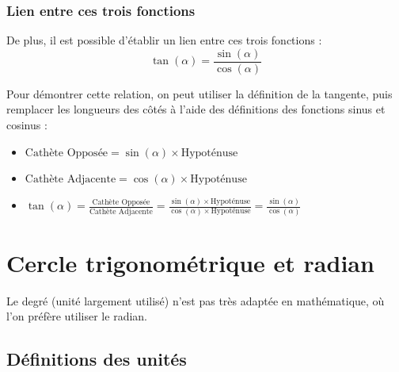 \documentclass[a4paper]{article}
\begin{document}
			\bigbreak
			\bigbreak
			\bigbreak
			\bigbreak
			\bigbreak
			\bigbreak



		\subsubsection{Lien entre ces trois fonctions}

			De plus,
			il est possible d'établir un lien entre ces trois fonctions :
			{ \LARGE $$ \tan(\alpha) = \frac{\sin(\alpha)}{\cos(\alpha)} $$}

			\medbreak
			\medbreak

			Pour démontrer cette relation, 
			on peut utiliser la définition de la tangente, 
			puis remplacer les longueurs des côtés à l'aide 
			des définitions des fonctions sinus et cosinus :

			\medbreak

			\begin{itemize}
				\item [ ] $\text{Cathète Opposée}   = \sin(\alpha) \times \text{Hypoténuse}$
				\item [ ] $\text{Cathète Adjacente} = \cos(\alpha) \times \text{Hypoténuse}$
			\end{itemize}

			\bigbreak

			\begin{Large}
			\begin{itemize}
				\item [ ] $\tan(\alpha) = \frac{\text{Cathète Opposée}}{\text{Cathète Adjacente}} = \frac{\sin(\alpha) \times \text{Hypoténuse}}{\cos(\alpha) \times \text{Hypoténuse}} = \frac{\sin(\alpha)}{\cos(\alpha)}$
			\end{itemize}
			\end{Large}

\newpage

	\section{Cercle trigonométrique et radian}

		Le degré (unité largement utilisé) n'est pas très adaptée en mathématique, où l'on préfère utiliser le radian.

		\subsection{Définitions des unités}
\end{document}
